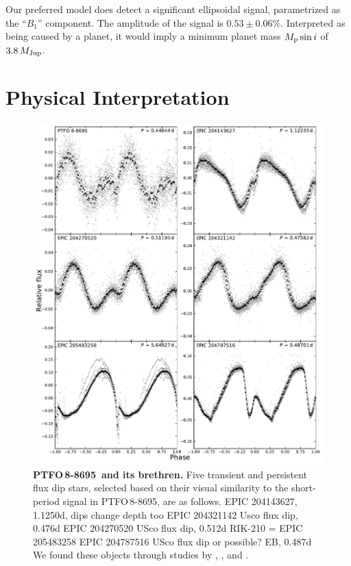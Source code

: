 \documentclass[12pt,twocolumn,tighten]{aastex62}
\newcommand{\ptfo}{PTFO$\,$8-8695}
\begin{document}
Our preferred model does detect a significant ellipsoidal signal,
parametrized as the ``$B_1$'' component.  The amplitude of the signal
is $0.53 \pm 0.06\%$.  Interpreted as being caused by a planet, it
would imply a minimum planet mass $M_{\rm p} \sin i$ of $3.8\,M_{\rm
Jup}$.




\section{Physical Interpretation}

\begin{figure}[hbtp]
	\begin{center}
		\leavevmode
		\includegraphics[width=1\textwidth]{f7.pdf}
	\end{center}
	\vspace{-0.7cm}
  \caption{ {\bf \ptfo\ and its brethren.}
    Five transient and persistent flux dip stars, selected based on
    their visual similarity to the short-period signal in \ptfo, are
    as follows.
  	EPIC 204143627, 1.1250d, dips change depth too
  	EPIC 204321142  Usco flux dip, 0.476d
  	EPIC 204270520  USco flux dip, 0.512d
  	RIK-210 = EPIC 205483258
 	EPIC 204787516  USco flux dip or possible? EB, 0.487d
 	We found these objects through studies by \citet{stauffer_orbiting_2017}, \citet{david_transient_2017}, and \citet{rebull_usco_2018}.
		\label{fig:brethren}
	}
\end{figure}
\end{document}
